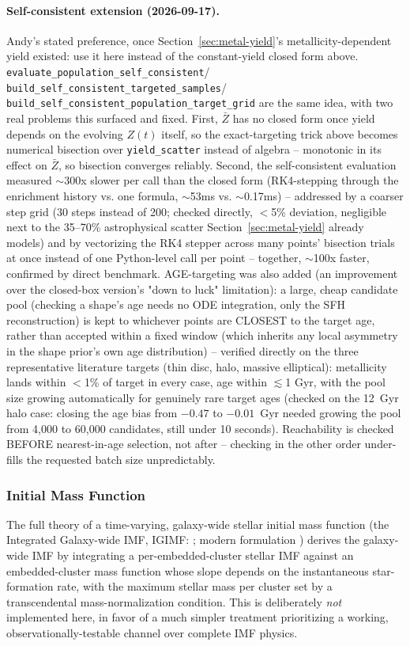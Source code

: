 \documentclass{aastex7}
\begin{document}
\paragraph{Self-consistent extension (2026-09-17).} Andy's stated
preference, once Section~\ref{sec:metal-yield}'s metallicity-dependent
yield existed: use it here instead of the constant-yield closed form
above. \texttt{evaluate\_population\_self\_consistent}/
\texttt{build\_self\_consistent\_targeted\_samples}/
\texttt{build\_self\_consistent\_population\_target\_grid} are
the same idea, with two real problems this surfaced and fixed. First,
$\bar{Z}$ has no closed form once yield depends on the evolving $Z(t)$
itself, so the exact-targeting trick above becomes numerical bisection
over \texttt{yield\_scatter} instead of algebra -- monotonic in its effect on
$\bar{Z}$, so bisection converges reliably. Second, the self-consistent
evaluation measured $\sim$300x slower per call than the closed form
(RK4-stepping through the enrichment history vs. one formula, $\sim$53ms
vs. $\sim$0.17ms) -- addressed by a coarser step grid (30 steps instead
of 200; checked directly, $<$5\% deviation, negligible next to the
35--70\% astrophysical scatter Section~\ref{sec:metal-yield} already
models) and by vectorizing the RK4 stepper across many points' bisection
trials at once instead of one Python-level call per point -- together,
$\sim$100x faster, confirmed by direct benchmark. AGE-targeting was also
added (an improvement over the closed-box version's "down to luck"
limitation): a large, cheap candidate pool (checking a shape's age needs
no ODE integration, only the SFH reconstruction) is kept to whichever
points are CLOSEST to the target age, rather than accepted within a fixed
window (which inherits any local asymmetry in the shape prior's own age
distribution) -- verified directly on the three representative literature
targets (thin disc, halo, massive elliptical): metallicity lands within
$<$1\% of target in every case, age within $\lesssim$1 Gyr, with the pool
size growing automatically for genuinely rare target ages (checked on the
12~Gyr halo case: closing the age bias from $-0.47$ to $-0.01$~Gyr needed
growing the pool from 4,000 to 60,000 candidates, still under 10 seconds).
Reachability is checked BEFORE nearest-in-age selection, not after --
checking in the other order under-fills the requested batch size
unpredictably.

\subsubsection{Initial Mass Function} \label{sec:imf}
The full theory of a time-varying, galaxy-wide stellar initial mass
function (the Integrated Galaxy-wide IMF, IGIMF: \citealt{KroupaWeidner2003};
modern formulation \citealt{Jerabkova2018}) derives the galaxy-wide IMF by
integrating a per-embedded-cluster stellar IMF against an embedded-cluster
mass function whose slope depends on the instantaneous star-formation rate,
with the maximum stellar mass per cluster set by a transcendental
mass-normalization condition. This is deliberately \emph{not} implemented
here, in favor of a much simpler treatment prioritizing a working,
observationally-testable channel over complete IMF physics.
\end{document}
